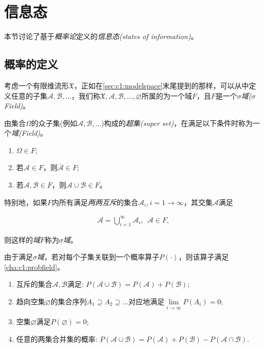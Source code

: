 \section{信息态}

本节讨论了基于\emph{概率论}定义的\emph{信息态(states of information)}。

\subsection{概率的定义}

考虑一个有限维流形$\mathfrak{X}$，正如在\autoref{sec:c1:modelspace}末尾提到的那样，可以从中定义任意的子集$\mathcal{A},\mathcal{B},\ldots$，我们称$\mathfrak{X},\mathcal{A},\mathcal{B},\ldots,\varnothing$所属的为一个域$F$，且$F$是一个\emph{$\sigma$域($\sigma$Field)}。

\begin{definition}[$\sigma$域]
  由集合$\Omega$的众子集(例如$\mathcal{A},\mathcal{B},\ldots$)构成的\emph{超集(super set)}，在满足以下条件时称为一个\emph{域(Field)}。
  
  \begin{enumerate}
    \item $\Omega \in F$;
    \item 若$\mathcal{A} \in F$，则$\bar{\mathcal{A}} \in F$;
    \item 若$\mathcal{A},\mathcal{B} \in F$，则$\mathcal{A} \cup \mathcal{B} \in F$。
  \end{enumerate}
  
  特别地，如果$F$内所有满足\emph{两两互斥}的集合$\mathcal{A}_i,i=1\rightarrow\infty$，其交集$\mathcal{A}$满足
  
  \begin{align} \label{fml:c1:sigmafield}
    \mathcal{A} = \bigcup_{i=1}^{\infty}\mathcal{A}_i,~~\mathcal{A} \in F,
  \end{align}
  
  则这样的\emph{域}$F$称为\emph{$\sigma$域}。
\end{definition}

由于满足\emph{$\sigma$域}，若对每个子集关联到一个概率算子$P(\cdot)$，则该算子满足\autoref{cha:c1:probfield}。

\begin{character}[概率算子的基本性质] \label{cha:c1:probfield}
  \mbox{{}}
  
  \begin{enumerate}
    \item 互斥的集合$\mathcal{A},\mathcal{B}$满足: $P(\mathcal{A}\cup\mathcal{B}) = P(\mathcal{A}) + P(\mathcal{B})$;
    \item 趋向空集$\varnothing$的集合序列$A_1 \supseteq A_2 \supseteq \ldots$对应地满足$\lim\limits_{i\rightarrow\infty}P(A_i) = 0$;
    \item 空集$\varnothing$满足$P(\varnothing) = 0$;
    \item 任意的两集合并集的概率: $P(\mathcal{A}\cup\mathcal{B}) = P(\mathcal{A}) + P(\mathcal{B}) - P(\mathcal{A}\cap\mathcal{B})$.
  \end{enumerate}
\end{character}

